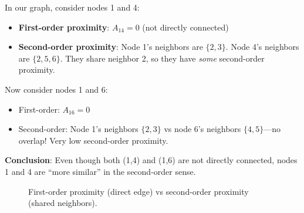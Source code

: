 \begin{notechapter}
\begin{example}
In our graph, consider nodes 1 and 4:
\begin{itemize}
    \item \textbf{First-order proximity}: $A_{14} = 0$ (not directly connected)
    \item \textbf{Second-order proximity}: Node 1's neighbors are $\{2, 3\}$. Node 4's neighbors are $\{2, 5, 6\}$. They share neighbor 2, so they have \emph{some} second-order proximity.
\end{itemize}

Now consider nodes 1 and 6:
\begin{itemize}
    \item First-order: $A_{16} = 0$
    \item Second-order: Node 1's neighbors $\{2,3\}$ vs node 6's neighbors $\{4,5\}$---no overlap! Very low second-order proximity.
\end{itemize}

\textbf{Conclusion}: Even though both (1,4) and (1,6) are not directly connected, nodes 1 and 4 are ``more similar'' in the second-order sense.
\end{example}

\begin{figure}[htbp]
\centering
{}
\caption{First-order proximity (direct edge) vs second-order proximity (shared neighbors).}
\label{shallow-embeddings:fig:proximity_types}
\end{figure}


\end{notechapter}
